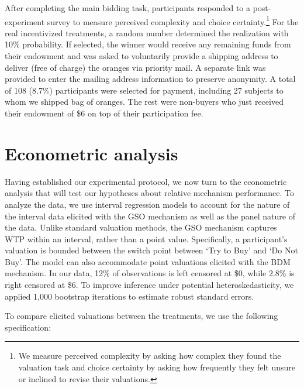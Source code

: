 \documentclass[12pt]{article}
\begin{document}
After completing the main bidding task, participants responded to a post-experiment survey to measure perceived complexity and choice certainty.\footnote{We measure perceived complexity by asking how complex they found the valuation task and choice certainty by asking how frequently they felt unsure or inclined to revise their valuations.} For the real incentivized treatments, a random number determined the realization with 10\% probability.  If selected, the winner would receive any remaining funds from their endowment and was asked to voluntarily provide a shipping address to deliver (free of charge) the oranges via priority mail. A separate link was provided to enter the mailing address information to preserve anonymity. A total of 108 (8.7\%) participants were selected for payment, including 27 subjects to whom we shipped bag of oranges. The rest were non-buyers who just received their endowment of \$6 on top of their participation fee. 



\section{Econometric analysis}
\label{Econometric}
Having established our experimental protocol, we now turn to the econometric analysis that will test our hypotheses about relative mechanism performance. To analyze the data, we use interval regression models to account for the nature of the interval data elicited with the GSO mechanism as well as the panel nature of the data. Unlike standard valuation methods, the GSO mechanism captures WTP within an interval, rather than a point value. Specifically, a participant's valuation is bounded between the switch point between `Try to Buy' and `Do Not Buy'. The model can also accommodate point valuations elicited with the BDM mechanism. In our data, 12\% of observations is left censored at \$0, while 2.8\% is right censored at \$6. To improve inference under potential heteroskedasticity, we applied 1,000 bootstrap iterations to estimate robust standard errors.

To compare elicited valuations between the treatments, we use the following specification:
\vspace{-1cm}
\end{document}
